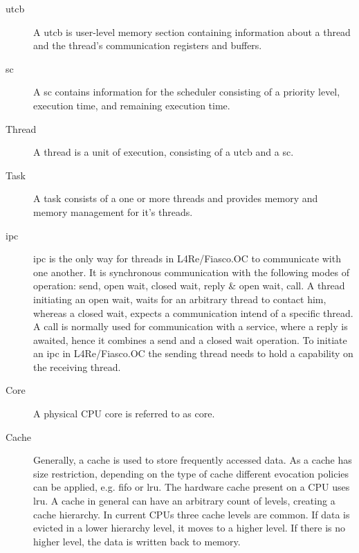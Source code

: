 \begin{description}
  \item[\Gls{utcb}] A \gls{utcb} is user-level memory section containing
    information about a thread and the thread's communication registers and
    buffers.

  \item[\Gls{sc}] A \gls{sc} contains information for the scheduler consisting
    of a priority level, execution time, and remaining execution time.

  \item[Thread] A thread is a unit of execution, consisting of a \gls{utcb}
    and a \gls{sc}.

  \item[Task] A task consists of a one or more threads and provides memory and
    memory management for it's threads.

  \item[\Gls{ipc}] \Gls{ipc} is the only way for threads in L4Re/Fiasco.OC
    to communicate with one another.
    It is synchronous communication with the following modes of operation:
    send, open wait, closed wait, reply \& open wait, call.
    A thread initiating an open wait, waits for an arbitrary thread to contact
    him, whereas a closed wait, expects a communication intend of a specific
    thread.
    A call is normally used for communication with a service, where a reply is
    awaited, hence it combines a send and a closed wait operation.
    To initiate an \gls{ipc} in L4Re/Fiasco.OC the sending thread needs to hold
    a capability on the receiving thread.


  \item[Core] A physical CPU core is referred to as core.

  \item[Cache] Generally, a cache is used to store frequently accessed data.
    As a cache has size restriction, depending on the type of cache different
    evocation policies can be applied, e.g. \gls{fifo} or \gls{lru}.
    The hardware cache present on a CPU uses \gls{lru}.
    A cache in general can have an arbitrary count of levels, creating a cache
    hierarchy.
    In current CPUs three cache levels are common.
    If data is evicted in a lower hierarchy level, it moves to a higher level.
    If there is no higher level, the data is written back to memory.


\end{description}
